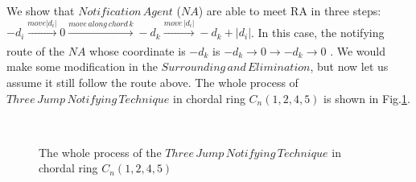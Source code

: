 We show that $Notification\,Agent$ ($NA$) are able to meet RA in three steps: $-d_i\xrightarrow[]{move\left | d_i \right |}0\xrightarrow[]{move\,along\,chord\,k}-d_k\xrightarrow[]{move\,\left | d_i \right |}-d_k+\left|d_i\right|$. In this case, the notifying route of the $NA$ whose coordinate is $-d_k$ is $-d_k{\rightarrow}0{\rightarrow}-d_k{\rightarrow}0$ . We would make some modification in the $Surrounding\,and\,Elimination$, but now let us assume it still follow the route above. The whole process of $Three\,Jump\,Notifying\,Technique$ in chordal ring $C_n(1, 2, 4, 5)$ is shown in Fig.\ref{fig:subfig}. 

\begin{figure} [H]
  \centering 
  \hspace{1in} 
   \
  \hspace{1in} 
  \hspace{1in} 
  \caption{The whole process of the $Three\,Jump\,Notifying\,Technique$ in chordal ring $C_n(1, 2, 4, 5)$} 
  \label{fig:subfig} %
\end{figure}


